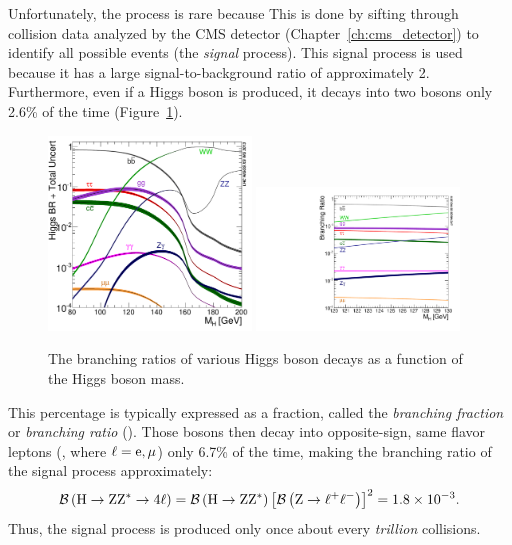 Unfortunately, the \hzzfourl process is rare because 
This is done by sifting through \pp collision data analyzed by the CMS detector (Chapter~\ref{ch:cms_detector}) to identify all possible \hzzfourl events (the \emph{signal} process).
This signal process is used because it has a large signal-to-background ratio of approximately 2.
Furthermore, even if a Higgs boson is produced, it decays into two \PZ bosons only 2.6\% of the time (Figure~\ref{fig:higgs_br}).
\begin{figure}[!htbp]
    \begin{center}
		\includegraphics[width=0.48\textwidth]{figures/higgsmassmeas/higgs_BR_80to200GeV.pdf}
		\includegraphics[width=0.48\textwidth]{figures/higgsmassmeas/higgs_BR_120to130GeV.pdf}
		\caption{The branching ratios of various Higgs boson decays as a function of the Higgs boson mass.}
		\label{fig:higgs_br}
	\end{center}
\end{figure}
This percentage is typically expressed as a fraction, called the \emph{branching fraction} or \emph{branching ratio} (\br).
Those \PZ bosons then decay into opposite-sign, same flavor leptons (\Ztolplm, where $\ell = \mathrm{e}, \mu$) only 6.7\% of the time, making the branching ratio of the signal process approximately: %
\begin{equation*}
    \BRof{\hzzfourl} = \BRof{\htozz} \left[ \BRof{\Ztolplm} \right]^2 = 1.8\tentotheminus{3}.
\end{equation*}
Thus, the signal process is produced only once about every \emph{trillion} \pp collisions.


